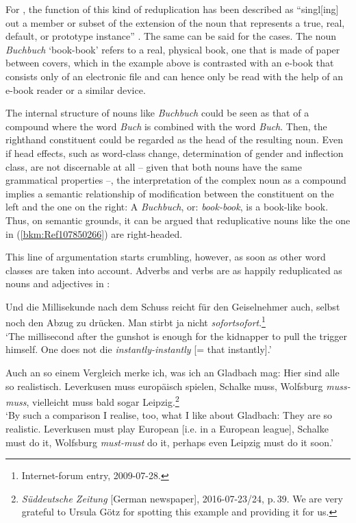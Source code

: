 \documentclass[output=paper
  ,nobabel
  ,draftmode
  ,colorlinks, citecolor=brown
]{langscibook}
\begin{document}
\noindent
For , the function of this kind of reduplication has been described as ``singl[ing] out a
member or subset of the extension of the noun that represents a true, real, default, or prototype
instance'' \citep[48]{Horn1993}. The same can be said for the  cases. The noun \emph{Buchbuch}
`book-book' refers to a real, physical book, one that is made of paper between covers, which in the
example above is contrasted with an e-book that consists only of an electronic file and can hence
only be read with the help of an e-book reader or a similar device.

The internal structure of nouns like \emph{Buchbuch} could be seen as that of a compound where the
word \emph{Buch} is combined with the word \emph{Buch}. Then, the righthand constituent could be
regarded as the head of the resulting noun. Even if head effects, such as word-class change,
determination of gender and inflection class, are not discernable at all – given that both nouns
have the same grammatical properties –, the interpretation of the complex noun as a compound implies
a semantic relationship of modification between the constituent on the left and the one on the
right: A \emph{Buchbuch}, or: \emph{book-book}, is a book-like book. Thus, on semantic grounds, it
can be argued that reduplicative nouns like the one in (\ref{bkm:Ref107850266}) are right-headed.

This line of argumentation starts crumbling, however, as soon as other word classes are taken into
account. Adverbs and verbs are as happily reduplicated as nouns and adjectives in :

\ea
\label{bkm:Ref107864878}%
Und die Millisekunde nach dem Schuss reicht für den Geiselnehmer auch, selbst noch den Abzug zu drücken. Man stirbt ja nicht \emph{sofortsofort}.\footnote{Internet-forum entry, 2009-07-28.}\\
`The millisecond after the gunshot is enough for the kidnapper to pull the trigger himself. One does not die \emph{instantly-instantly} [= that instantly].'
\z

\ea
\label{bkm:Ref107850306}%
Auch an so einem Vergleich merke ich, was ich an Gladbach mag: Hier sind alle so realistisch. Leverkusen muss europäisch spielen, Schalke muss, Wolfsburg \emph{muss-muss}, vielleicht muss bald sogar Leipzig.\footnote{\emph{Süddeutsche Zeitung} [German newspaper], 2016-07-23/24, p.\,39. We are very grateful to Ursula Götz for spotting this example and providing it for us.}\\
`By such a comparison I realise, too, what I like about Gladbach: They are so realistic. Leverkusen must play European [i.e. in a European league], Schalke must do it, Wolfsburg \emph{must-must} do it, perhaps even Leipzig must do it soon.'
\z
\end{document}
